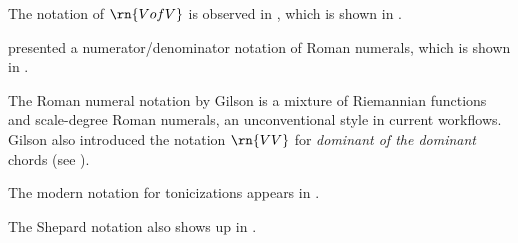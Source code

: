 The notation of $\rn{V of V}$ is observed in
\textcite{mokrejs1913lessons}, which is shown in
.


\textcite{gilson1919traite} presented a
numerator/denominator notation of Roman numerals, which is
shown in .



The Roman numeral notation by Gilson is a mixture of
Riemannian functions and scale-degree Roman numerals, an
unconventional style in current workflows. Gilson also
introduced the notation $\rn{VV}$ for \emph{dominant of the
dominant} chords (see
).


The modern notation for tonicizations appears in
\textcite{tischler1964practical}.

The Shepard notation also shows up in
\textcite{goldman1965harmony}.
